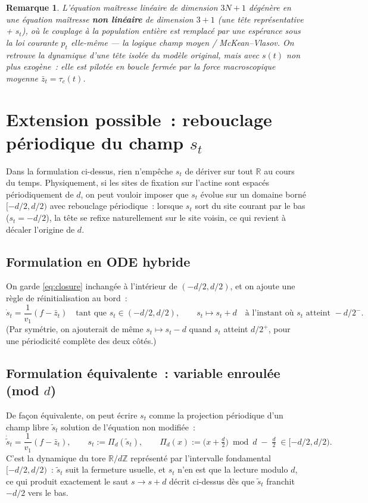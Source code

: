 \documentclass[11pt,a4paper]{article}
\newcommand{\R}{\mathbb{R}}
\theoremstyle{plain}
\newtheorem*{remark*}{Remarque}
\theoremstyle{definition}
\begin{document}
\begin{remark*}
L'\'equation ma\^itresse lin\'eaire de dimension $3N+1$ d\'eg\'en\`ere en une \'equation ma\^itresse \textbf{non lin\'eaire} de dimension $3+1$ (une t\^ete repr\'esentative + $s_t$), o\`u le couplage \`a la population enti\`ere est remplac\'e par une esp\'erance sous la loi \emph{courante} $p_t$ elle-m\^eme --- la logique champ moyen / McKean--Vlasov. On retrouve la dynamique d'une t\^ete isol\'ee du mod\`ele original, mais avec $s(t)$ non plus exog\`ene~: elle est pilot\'ee en boucle ferm\'ee par la force macroscopique moyenne $\bar z_t=\tau_c(t)$.
\end{remark*}

\section{Extension possible~: rebouclage p\'eriodique du champ $s_t$}
\label{sec:periodic}

Dans la formulation ci-dessus, rien n'emp\^eche $s_t$ de d\'eriver sur tout $\R$ au cours du temps. Physiquement, si les sites de fixation sur l'actine sont espac\'es p\'eriodiquement de $d$, on peut vouloir imposer que $s_t$ \'evolue sur un domaine born\'e $[-d/2,d/2)$ avec rebouclage p\'eriodique~: lorsque $s_t$ sort du site courant par le bas ($s_t=-d/2$), la t\^ete se refixe naturellement sur le site voisin, ce qui revient \`a d\'ecaler l'origine de $d$.

\subsection{Formulation en ODE hybride}

On garde \eqref{eq:closure} inchang\'ee \`a l'int\'erieur de $(-d/2,d/2)$, et on ajoute une r\`egle de r\'einitialisation au bord~:
\[
\dot s_t=\frac{1}{v_1}(f-\bar z_t) \quad\text{tant que } s_t\in(-d/2,d/2), \qquad s_t \longmapsto s_t+d \quad\text{\`a l'instant o\`u } s_t \text{ atteint } -d/2^-.
\]
(Par sym\'etrie, on ajouterait de m\^eme $s_t\mapsto s_t-d$ quand $s_t$ atteint $d/2^+$, pour une p\'eriodicit\'e compl\`ete des deux c\^ot\'es.)

\subsection{Formulation \'equivalente~: variable enroul\'ee (mod $d$)}

De fa\c con \'equivalente, on peut \'ecrire $s_t$ comme la projection p\'eriodique d'un champ libre $\tilde s_t$ solution de l'\'equation non modifi\'ee~:
\[
\dot{\tilde s}_t=\frac{1}{v_1}(f-\bar z_t), \qquad s_t:=\Pi_d(\tilde s_t), \qquad \Pi_d(x):=\Big(x+\tfrac d2\Big)\bmod d\;-\;\tfrac d2 \;\in[-d/2,d/2).
\]
C'est la dynamique du tore $\R/d\mathbb{Z}$ repr\'esent\'e par l'intervalle fondamental $[-d/2,d/2)$~: $\tilde s_t$ suit la fermeture usuelle, et $s_t$ n'en est que la lecture modulo $d$, ce qui produit exactement le saut $s\to s+d$ d\'ecrit ci-dessus d\`es que $\tilde s_t$ franchit $-d/2$ vers le bas.
\end{document}
